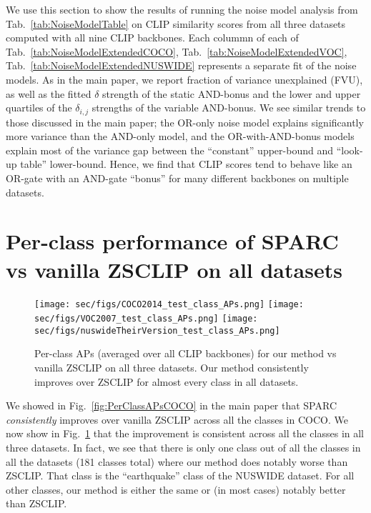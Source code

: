 

We use this section to show the results of running the noise model analysis from Tab.~\ref{tab:NoiseModelTable} on CLIP similarity scores from all three datasets computed with all nine CLIP backbones. Each colummn of each of Tab.~\ref{tab:NoiseModelExtendedCOCO}, Tab.~\ref{tab:NoiseModelExtendedVOC}, Tab.~\ref{tab:NoiseModelExtendedNUSWIDE} represents a separate fit of the noise models. As in the main paper, we report fraction of variance unexplained (FVU), as well as the fitted $\delta$ strength of the static AND-bonus and the lower and upper quartiles of the $\delta_{i,j}$ strengths of the variable AND-bonus. We see similar trends to those discussed in the main paper; the OR-only noise model explains significantly more variance than the AND-only model, and the OR-with-AND-bonus models explain most of the variance gap between the ``constant'' upper-bound and ``look-up table'' lower-bound. Hence, we find that CLIP scores tend to behave like an OR-gate with an AND-gate ``bonus'' for many different backbones on multiple datasets.

\section{Per-class performance of SPARC vs vanilla ZSCLIP on all datasets}
\label{sec:per_class_APs_all_datasets}

\begin{figure}[t]
  \centering
    \texttt{[image: sec/figs/COCO2014\_test\_class\_APs.png]}
    \texttt{[image: sec/figs/VOC2007\_test\_class\_APs.png]}
    \texttt{[image: sec/figs/nuswideTheirVersion\_test\_class\_APs.png]}
    \caption{Per-class APs (averaged over all CLIP backbones) for our method vs vanilla ZSCLIP on all three datasets. Our method consistently improves over ZSCLIP for almost every class in all datasets.}
    \label{fig:PerClassAPsAllDatasets}
\end{figure}

We showed in Fig.~\ref{fig:PerClassAPsCOCO} in the main paper that SPARC \emph{consistently} improves over vanilla ZSCLIP across all the classes in COCO. We now show in Fig.~\ref{fig:PerClassAPsAllDatasets} that the improvement is consistent across all the classes in all three datasets. In fact, we see that there is only one class out of all the classes in all the datasets (181 classes total) where our method does notably worse than ZSCLIP. That class is the ``earthquake'' class of the NUSWIDE dataset. For all other classes, our method is either the same or (in most cases) notably better than ZSCLIP. 

